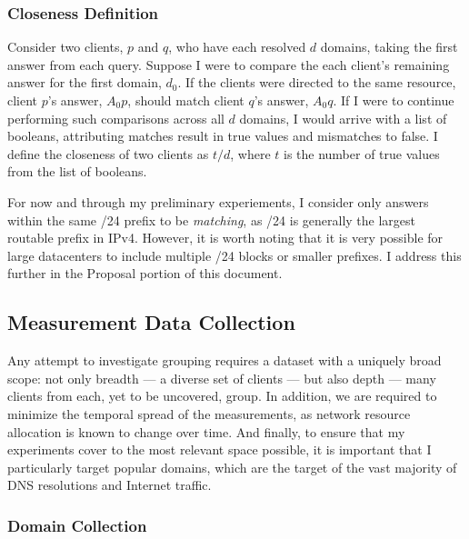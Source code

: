 \subsubsection{Closeness Definition} \label{closeness}

Consider two clients, $p$ and $q$,  who have each resolved $d$ domains, taking the first answer from
each query.  Suppose I were to compare the each client's remaining answer for the first domain,
$d_0$. If the clients were directed to the same resource, client $p$'s answer, $A_0p$, should match
client $q$'s answer, $A_0q$. If I were to continue performing such comparisons across all $d$
domains, I would arrive with a list of booleans, attributing matches result in true values and
mismatches to false.  I define the closeness of two clients as $t / d$, where $t$ is the number of
true values from the list of booleans. 

For now and through my preliminary experiements, I consider only answers within the
same /24 prefix to be \emph{matching}, as /24 is generally the largest routable prefix in IPv4.
However, it is worth noting that it is very possible for large datacenters to include multiple /24
blocks or smaller prefixes. I address this further in the Proposal portion of this document.

\subsection{Measurement Data Collection} \label{sky:data}

Any attempt to investigate grouping requires a dataset with a
uniquely broad scope: not only breadth --- a diverse set of clients --- but also depth --- many
clients from each, yet to be uncovered, group. In addition, we are required to minimize the
temporal spread of the measurements, as network resource allocation is known to change over time.
And finally, to ensure that my experiments cover to the most relevant space possible, it is
important that I particularly target popular domains, which are the target of the vast majority
of DNS resolutions and Internet traffic.

\subsubsection{Domain Collection}

